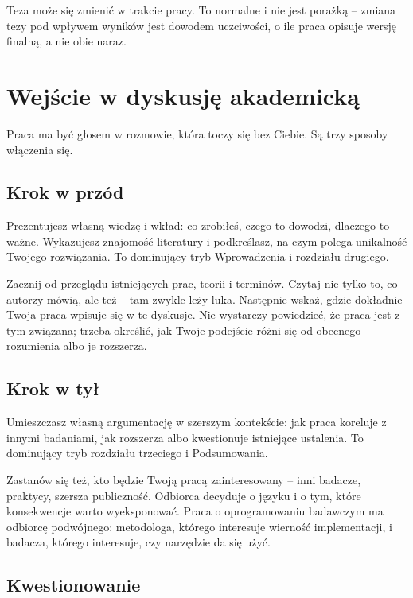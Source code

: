 Teza może się zmienić w trakcie pracy. To normalne i nie jest porażką -- zmiana tezy pod wpływem wyników jest dowodem uczciwości, o ile praca opisuje wersję finalną, a nie obie naraz.

\section{Wejście w dyskusję akademicką}

Praca ma być głosem w rozmowie, która toczy się bez Ciebie. Są trzy sposoby włączenia się.

\subsection{Krok w przód}

Prezentujesz własną wiedzę i wkład: co zrobiłeś, czego to dowodzi, dlaczego to ważne. Wykazujesz znajomość literatury i podkreślasz, na czym polega unikalność Twojego rozwiązania. To dominujący tryb Wprowadzenia i rozdziału drugiego.

Zacznij od przeglądu istniejących prac, teorii i terminów. Czytaj nie tylko to, co autorzy mówią, ale też  -- tam zwykle leży luka. Następnie wskaż, gdzie dokładnie Twoja praca wpisuje się w te dyskusje. Nie wystarczy powiedzieć, że praca jest z tym związana; trzeba określić, jak Twoje podejście różni się od obecnego rozumienia albo je rozszerza.

\subsection{Krok w tył}

Umieszczasz własną argumentację w szerszym kontekście: jak praca koreluje z innymi badaniami, jak rozszerza albo kwestionuje istniejące ustalenia. To dominujący tryb rozdziału trzeciego i Podsumowania.

Zastanów się też, kto będzie Twoją pracą zainteresowany -- inni badacze, praktycy, szersza publiczność. Odbiorca decyduje o języku i o tym, które konsekwencje warto wyeksponować. Praca o oprogramowaniu badawczym ma odbiorcę podwójnego: metodologa, którego interesuje wierność implementacji, i badacza, którego interesuje, czy narzędzie da się użyć.

\subsection{Kwestionowanie}

